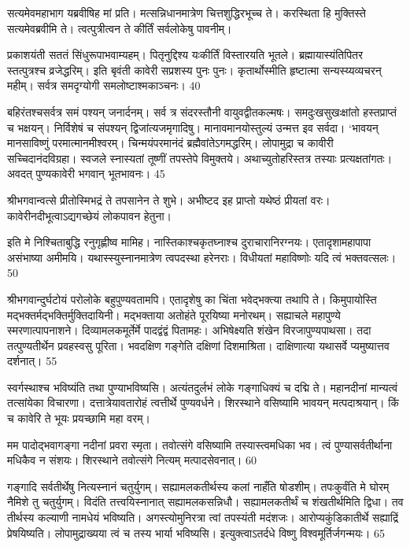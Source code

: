 सत्यमेवमहाभाग यब्रवीषिह मां प्रति।
मत्सन्निधानमात्रेण चित्तशुद्धिरभूच्च ते।
करस्थिता हि मुक्तिस्ते सत्यमेवब्रवीमि ते।
त्वत्पुत्रीत्वन ते कीर्तिं सर्वलोकेषु पावनीम्।

प्रकाशयंती सततं सिंधुरूपाभवाम्यहम्।
पितृनुद्दिश्य यःकीर्तिं विस्तारयति भूतले।
ब्रह्मायास्यंतिपितर स्तत्पुत्रश्च व्रजेद्धरिम्।
इति बृवंती कावेरी सप्रशस्य पुनः पुनः।
कृतार्थोस्मीति हृष्टात्मा सन्यस्य्यव्यचरन् महीम्।
सर्वत्र समदृग्योगी समलोष्टाश्मकाञ्चनः।
40

बहिरंतश्चसर्वत्र समं पश्यन् जनार्दनम्।
सर्व त्र संदरस्तौनी वायुवद्वीतकल्मषः।
समदुःखसुखःक्षांतो हस्तप्राप्तं च भक्षयन्।
निर्विशेषं च संपश्यन् द्विजांत्यजमृगादिषु।
मानावमानयोस्तुल्यं उन्मत्त इव सर्वदा।
‘भावयन् मानसाविष्णुं परमात्मानमीश्वरम्।
चिन्मयंपरमानंदं ब्रह्मैवांतेऽगमद्धरिम्।
लोपामुद्रा च कावीरी सच्चिदानंदविग्रहा।
स्वजले स्नास्यतां तूष्णीं तपस्तेपे विमुक्तये।
अथाच्युतोहरिस्तत्र तस्याः प्रत्यक्षतांगतः।
अवदत् पुण्यकावेरी भगवान् भूतभावनः।
45

श्रीभगवान्वत्से प्रीतोस्मिभद्रं ते तपसानेन ते शुभे।
अभीष्टद इह प्राप्तो यथेष्ठं प्रीयतां वरः।
कावेरीनदीभूत्वाऽद्यगच्छेयं लोकपावन हेतुना।

इति मे निश्चिताबुद्धि रनुगृह्णीष्व मामिह।
नास्तिकाश्चकृतघ्नाश्च दुराचारानिरग्नयः।
एतादृशामहापापा असंभाष्या अमीमयि।
यथास्स्युस्नानमात्रेण त्वपदस्था हरेनराः।
विधीयतां महाविष्णोः यदि त्वं भक्तवत्सलः।
50

श्रीभगवान्दुर्घटोयं परोलोके बहुपुण्यवतामपि।
एतादृशेषु का चिंता भवेद्भक्त्या तथापि ते।
किमुपायोस्ति मद्भक्तर्मद्भक्तिर्मुक्तिदायिनी।
मद्भक्ताया अतोहंते पूरयिष्या मनोरथम्।
सह्याचले महापुण्ये स्मरणात्पापनाशने।
दिव्यामलकमूर्तेर्मे पादद्वंद्वं पितामहः।
अभिषेक्ष्यति शंखेन विरजापुण्यपाथसा।
तदा तत्पुण्यतीर्थेन प्रवहस्वसु पूरिता।
भवदक्षिण गङ्गेति दक्षिणां दिशमाश्रिता।
दाक्षिणात्या यथासर्वे प्यमुष्यात्तव दर्शनात्।
55

स्वर्गस्थाश्च भविष्यंति तथा पुण्याभविष्यसि।
अत्यंतदुर्लभं लोके गङ्गाधिक्यं च दद्मि ते।
महानदीनां मान्यत्वं तत्सांयेका विचारणा।
दत्तात्रेयावतारोहं त्वत्तीर्थे पुण्यवर्धने।
शिरस्थाने वसिष्यामि भावयन् मत्पदाश्रयान्।
किं च कावेरि ते भूयः प्रयच्छामि महा वरम्।

मम पादोद्भवागङ्गा नदीनां प्रवरा स्मृता।
तवोत्संगे वसिष्यामि तस्यास्त्वमधिका भव।
त्वं पुण्यासर्वतीर्थाना मधिकैव न संशयः।
शिरस्थाने तवोत्संगे नित्यम् मत्पादसेवनात्।
60

गङ्गादि सर्वतीर्थेषु नित्यस्नानं चतुर्युगम्।
सह्यामलकतीर्थस्य कलां नाहँति षोडशीम्।
तपःकुर्वंति मे घोरम् नैमिशे तु चतुर्युगम्।
विदंति तत्त्वयिस्नानात् सह्यामलकसन्निधौ।
सह्यामलकतीर्थं च शंखतीर्थमिति द्विधा।
तव तीर्थस्य कल्याणी नामधेयं भविष्यति।
अगस्त्योमुनिरत्रा त्वां तपस्यंती मदंशजः।
आरोप्यकुंडिकातीर्थे सह्याद्रिं प्रेषयिष्यति।
लोपामुद्राख्यया त्वं च तस्य भार्या भविष्यसि।
इत्युक्त्वाऽतर्दधे विष्णु विश्वमूर्तिर्जगन्मयः।
65

